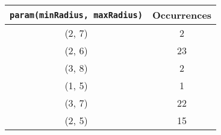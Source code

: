 \documentclass[letterpaper, 12pt]{article}
\begin{document}
\begin{longtable}{|c|c|}
\hline
\textbf{\texttt{param(minRadius, maxRadius)}} & \textbf{Occurrences} \\
\hline
(2, 7) & 2 \\
\hline
(2, 6) & 23 \\
\hline
(3, 8) & 2 \\
\hline
(1, 5) & 1 \\
\hline
(3, 7) & 22 \\
\hline
(2, 5) & 15 \\
\hline
\end{longtable}
\end{document}
